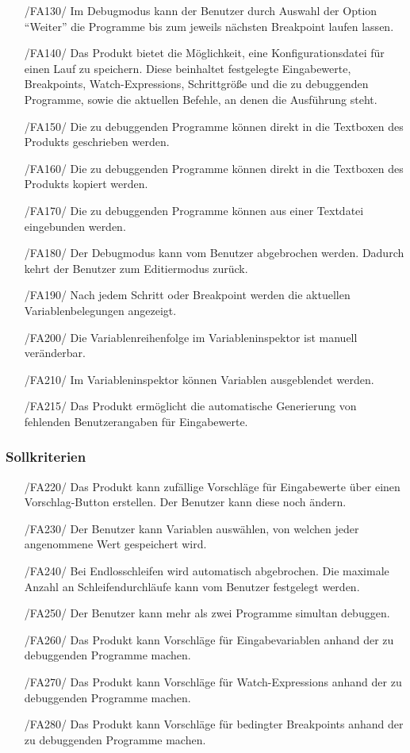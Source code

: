 \documentclass[parskip=full]{scrartcl}
\begin{document}
\begin{itemize}
		\item[/FA130/] Im \gls{Debugmodus} kann der Benutzer durch Auswahl der Option \enquote{Weiter} die Programme bis zum jeweils nächsten Breakpoint laufen lassen.
		\item[/FA140/] Das Produkt bietet die Möglichkeit, eine \gls{Konfigurationsdatei} für einen Lauf zu speichern. Diese beinhaltet festgelegte Eingabewerte, \glspl{Breakpoint}, \glspl{Watch-Expression}, Schrittgröße und die zu debuggenden Programme, sowie die aktuellen Befehle, an denen die Ausführung steht.
		\item[/FA150/] Die zu debuggenden Programme können direkt in die Textboxen des Produkts  geschrieben werden.
		\item[/FA160/] Die zu debuggenden Programme können direkt in die Textboxen des Produkts kopiert werden.
		\item[/FA170/] Die zu debuggenden Programme können aus einer Textdatei eingebunden werden.
		\item[/FA180/] Der \gls{Debugmodus} kann vom Benutzer abgebrochen werden. Dadurch kehrt der Benutzer zum \gls{Editiermodus} zurück.
		\item[/FA190/] Nach jedem \gls{Schritt} oder \gls{Breakpoint} werden die aktuellen Variablenbelegungen angezeigt.
		\item[/FA200/] Die Variablenreihenfolge im Variableninspektor ist manuell veränderbar.
		\item[/FA210/] Im Variableninspektor können Variablen ausgeblendet werden.
		\item[/FA215/] Das Produkt ermöglicht die automatische Generierung von fehlenden Benutzerangaben für Eingabewerte.
		\end{itemize}

 		\subsubsection{Sollkriterien}
		\begin{itemize}
		\item[/FA220/] Das Produkt kann zufällige Vorschläge für Eingabewerte über einen Vorschlag-Button erstellen. Der Benutzer kann diese noch ändern.
		\item[/FA230/] Der Benutzer kann Variablen auswählen, von welchen jeder angenommene Wert gespeichert wird.
		\item[/FA240/] Bei Endlosschleifen wird automatisch abgebrochen. Die maximale Anzahl an Schleifendurchläufe kann vom Benutzer festgelegt werden.
		\item[/FA250/] Der Benutzer kann mehr als zwei Programme simultan debuggen.
		\item[/FA260/] Das Produkt kann Vorschläge für Eingabevariablen anhand der zu debuggenden Programme machen.
		\item[/FA270/] Das Produkt kann Vorschläge für \glspl{Watch-Expression} anhand der zu debuggenden Programme machen.
		\item[/FA280/] Das Produkt kann Vorschläge für \glspl{bedingter Breakpoint} anhand der zu debuggenden Programme machen.
		\end{itemize}
\end{document}
